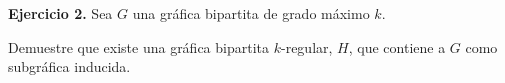\textbf{Ejercicio 2.} Sea $G$ una gráfica bipartita de grado máximo $k$.

Demuestre que existe una gráfica bipartita $k$-regular, $H$, que contiene a $G$ como
subgráfica inducida.